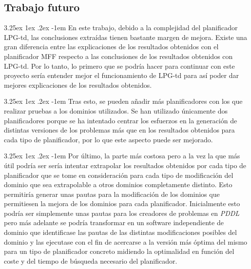 \documentclass{article}
\makeatletter
\renewcommand\paragraph{\@startsection{paragraph}{5}{\z@}%
      {3.25ex \@plus1ex \@minus.2ex}%
      {-1em}%
      {\normalfont\normalsize\bfseries}}
\makeatother
\begin{document}
    \subsection{Trabajo futuro}
    \paragraph{}
    En este trabajo, debido a la complejidad del planificador LPG-td, las conclusiones extraídas tienen bastante margen de mejora. Existe una gran diferencia entre las explicaciones de los resultados obtenidos con el planificador MFF respecto a las conclusiones de los resultados obtenidos con LPG-td. Por lo tanto, lo primero que se podría hacer para continuar con este proyecto sería entender mejor el funcionamiento de LPG-td para así poder dar mejores explicaciones de los resultados obtenidos.
    
    \paragraph{}
    Tras esto, se pueden añadir más planificadores con los que realizar pruebas a los dominios utilizados. Se han utilizado únicamente dos planificadores porque se ha intentado centrar los esfuerzos en la generación de distintas versiones de los problemas más que en los resultados obtenidos para cada tipo de planificador, por lo que este aspecto puede ser mejorado.
    
    \paragraph{}
    Por último, la parte más costosa pero a la vez la que más útil podría ser sería intentar extrapolar los resultados obtenidos por cada tipo de planificador que se tome en consideración para cada tipo de modificación del dominio que sea extrapolable a otros dominios completamente distinto. Esto permitiría generar unas pautas para la modificación de los dominios que permitiesen la mejora de los dominios para cada planificador. Inicialmente esto podría ser simplemente unas pautas para los creadores de problemas en \textit{PDDL} pero más adelante se podría transformar en un software independiente de dominio que identificase las pautas de las distintas modificaciones posibles del dominio y las ejecutase con el fin de acercarse a la versión más óptima del mismo para un tipo de planificador concreto midiendo la optimalidad en función del coste y del tiempo de búsqueda necesario del planificador.
    
\end{document}
